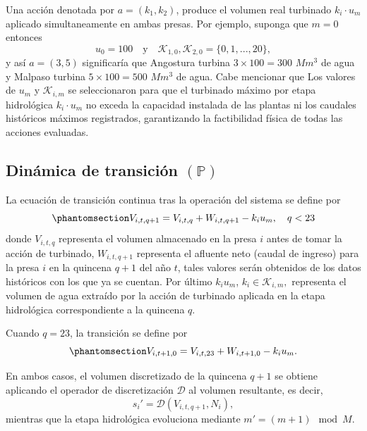 \documentclass[
  letterpaper,
  DIV=11,
  numbers=noendperiod]{scrreprt}
\theoremstyle{definition}
\theoremstyle{remark}
\begin{document}
Una acción denotada por \(a = (k_1, k_2)\), produce el volumen real
turbinado \(k_i\cdot u_m\) aplicado simultaneamente en ambas presas. Por
ejemplo, suponga que \(m = 0\) entonces
\[u_0 = 100 \quad \text{y} \quad \mathcal{K}_{1,0}, \mathcal{K}_{2,0} = \{0,1,...,20\},\]
y así \(a = (3,5)\) significaría que Angostura turbina
\(3\times 100 = 300\) \(Mm^3\) de agua y Malpaso turbina
\(5\times 100 = 500\) \(Mm^3\) de agua. Cabe mencionar que Los valores
de \(u_m\) y \(\mathcal{K}_{i,m}\) se seleccionaron para que el
turbinado máximo por etapa hidrológica \(k_{i} \cdot u_m\) no exceda la
capacidad instalada de las plantas ni los caudales históricos máximos
registrados, garantizando la factibilidad física de todas las acciones
evaluadas.

\subsection{\texorpdfstring{Dinámica de transición
\((\mathbb{P})\)}{Dinámica de transición (\textbackslash mathbb\{P\})}}\label{dinuxe1mica-de-transiciuxf3n-mathbbp}

La ecuación de transición continua tras la operación del sistema se
define por
\begin{equation}\protect\phantomsection\label{eq-transicion}{V_{i,t,q+1} = V_{i,t,q} + W_{i, t, q+1}-k_iu_m, \quad q<23}\end{equation}
donde \(V_{i,t,q}\) representa el volumen almacenado en la presa \(i\)
antes de tomar la acción de turbinado, \(W_{i, t,q+1}\) representa el
afluente neto (caudal de ingreso) para la presa \(i\) en la quincena
\(q+1\) del año \(t\), tales valores serán obtenidos de los datos
históricos con los que ya se cuentan. Por último \(k_iu_m\),
\(k_i \in \mathcal{K}_{i,m},\) representa el volumen de agua extraído
por la acción de turbinado aplicada en la etapa hidrológica
correspondiente a la quincena \(q\).

Cuando \(q=23\), la transición se define por
\begin{equation}\protect\phantomsection\label{eq-transicion23}{V_{i,t+1,0} = V_{i,t,23} + W_{i, t+1, 0}-k_iu_m.}\end{equation}

En ambos casos, el volumen discretizado de la quincena \(q+1\) se
obtiene aplicando el operador de discretización \(\mathcal{D}\) al
volumen resultante, es decir, \[s_i' = \mathcal{D}(V_{i,t,q+1}, N_i),\]
mientras que la etapa hidrológica evoluciona mediante
\(m' = (m+1) \mod M\).
\end{document}
